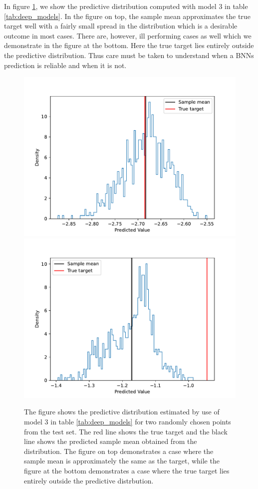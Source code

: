 In figure \ref{fig:predictive_distributions}, we show the predictive distribution computed with model 3 in table \ref{tab:deep_models}. In the figure on top, the sample mean approximates the true target well with a fairly small spread in the distribution which is a desirable outcome in most cases. There are, however, ill performing cases as well which we demonstrate in the figure at the bottom. Here the true target lies entirely outside the predictive distribution. Thus care must be taken to understand when a BNNs prediction is reliable and when it is not. 
\begin{figure}[H]
    \centering
    \includegraphics[scale=0.5]{figures/predictive_distributions/predictive_distribution_point_idx_360.pdf}
    \includegraphics[scale=0.5]{figures/predictive_distributions/predictive_distribution_point_idx_2052.pdf}
    \caption{
        The figure shows the predictive distribution estimated by use of model 3 in table \ref{tab:deep_models} for two randomly chosen points from the test set. The red line shows the true target and the black line shows the predicted sample mean obtained from the distribution. The figure on top demonstrates a case where the sample mean is approximately the same as the target, while the figure at the bottom demonstrates a case where the true target lies entirely outside the predictive distrbution. 
    }
    \label{fig:predictive_distributions}
\end{figure}


